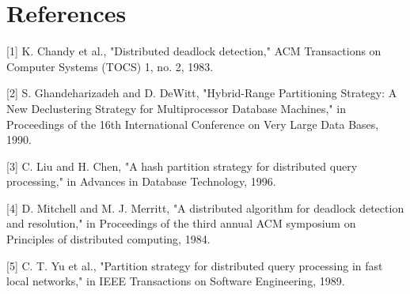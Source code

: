 \documentclass[a4paper, 10pt, notitlepage]{article}
\begin{document}
\section{References}
[1]
K. Chandy et al., "Distributed deadlock detection," ACM Transactions on Computer Systems (TOCS) 1, no. 2, 1983.

[2]
S. Ghandeharizadeh and D. DeWitt, "Hybrid-Range Partitioning Strategy: A New Declustering Strategy for Multiprocessor Database Machines," in Proceedings of the 16th International Conference on Very Large Data Bases, 1990.

[3]
C. Liu and H. Chen, "A hash partition strategy for distributed query processing," in Advances in Database Technology, 1996.

[4]
D. Mitchell and M. J. Merritt, "A distributed algorithm for deadlock detection and resolution," in Proceedings of the third annual ACM symposium on Principles of distributed computing, 1984.

[5]
C. T. Yu et al., "Partition strategy for distributed query processing in fast local networks," in IEEE Transactions on Software Engineering, 1989.

\end{document}
